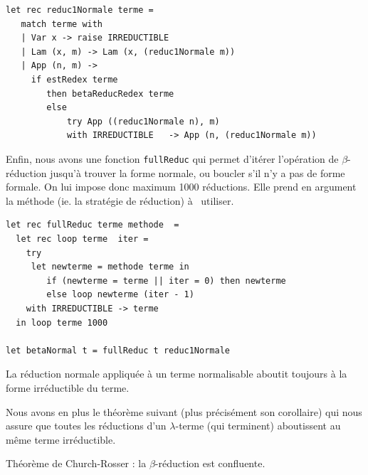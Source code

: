 \begin{Verbatim}
let rec reduc1Normale terme =
   match terme with
   | Var x -> raise IRREDUCTIBLE 
   | Lam (x, m) -> Lam (x, (reduc1Normale m))
   | App (n, m) ->
	 if estRedex terme
		then betaReducRedex terme
		else
			try App ((reduc1Normale n), m)
			with IRREDUCTIBLE   -> App (n, (reduc1Normale m)) 
\end{Verbatim}

Enfin, nous avons une fonction \verb+fullReduc+ qui permet d'itérer l'opération de
$\beta$-réduction jusqu'à trouver la forme normale, ou boucler s'il n'y a pas de forme formale.
On lui impose donc maximum 1000 réductions. 
Elle prend en argument la méthode (ie. la stratégie de réduction) à  utiliser. 

\begin{Verbatim}
let rec fullReduc terme methode  =
  let rec loop terme  iter =
	try
	 let newterme = methode terme in
		if (newterme = terme || iter = 0) then newterme
		else loop newterme (iter - 1)
	with IRREDUCTIBLE -> terme	
  in loop terme 1000
	
let betaNormal t = fullReduc t reduc1Normale
\end{Verbatim}

\begin{theoreme}
La réduction normale appliquée à un terme normalisable aboutit toujours à la forme irréductible du terme.
\end{theoreme}

Nous avons en plus le théorème suivant (plus précisément son corollaire) qui nous assure que toutes les réductions d'un $\lambda$-terme (qui terminent) aboutissent au m\^{e}me
terme irréductible.



\begin{theoreme}
Théorème de Church-Rosser : la $\beta $-réduction est confluente.
\end{theoreme}

